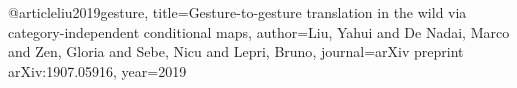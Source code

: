@article{liu2019gesture,
  title={Gesture-to-gesture translation in the wild via category-independent conditional maps},
  author={Liu, Yahui and De Nadai, Marco and Zen, Gloria and Sebe, Nicu and Lepri, Bruno},
  journal={arXiv preprint arXiv:1907.05916},
  year={2019}
}